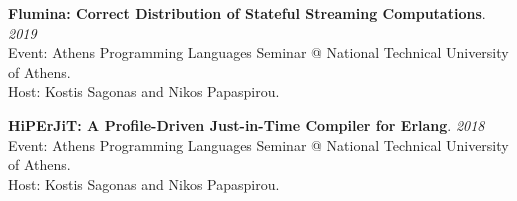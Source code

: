 \begin{minipage}{\textwidth}
\textbf{Flumina: Correct Distribution of Stateful Streaming Computations}. \hfill {\em 2019}\\
Event: Athens Programming Languages Seminar @ National Technical University of Athens.\\
 Host: Kostis Sagonas and Nikos Papaspirou.
\end{minipage}

\begin{minipage}{\textwidth}
\textbf{HiPErJiT: A Profile-Driven Just-in-Time Compiler for Erlang}. \hfill {\em 2018}\\
Event: Athens Programming Languages Seminar @ National Technical University of Athens.\\
 Host: Kostis Sagonas and Nikos Papaspirou.
\end{minipage}


